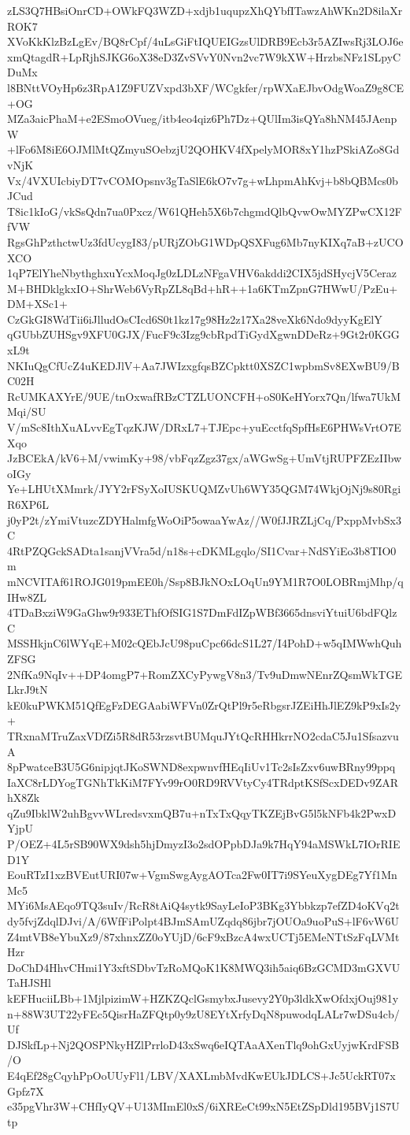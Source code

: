 zLS3Q7HBsiOnrCD+OWkFQ3WZD+xdjb1uqupzXhQYbfITawzAhWKn2D8ilaXrROK7
XVoKkKlzBzLgEv/BQ8rCpf/4uLsGiFtIQUEIGzsUlDRB9Ecb3r5AZIwsRj3LOJ6e
xmQtagdR+LpRjhSJKG6oX38eD3ZvSVvY0Nvn2vc7W9kXW+HrzbsNFz1SLpyCDuMx
l8BNttVOyHp6z3RpA1Z9FUZVxpd3bXF/WCgkfer/rpWXaEJbvOdgWoaZ9g8CE+OG
MZa3aicPhaM+e2ESmoOVueg/itb4eo4qiz6Ph7Dz+QUlIm3isQYa8hNM45JAenpW
+lFo6M8iE6OJMlMtQZmyuSOebzjU2QOHKV4fXpelyMOR8xY1hzPSkiAZo8GdvNjK
Vx/4VXUIcbiyDT7vCOMOpsnv3gTaSlE6kO7v7g+wLhpmAhKvj+b8bQBMcs0bJCud
T8ic1kIoG/vkSsQdn7ua0Pxcz/W61QHeh5X6b7chgmdQlbQvwOwMYZPwCX12FfVW
RgsGhPzthctwUz3fdUcygI83/pURjZObG1WDpQSXFug6Mb7nyKIXq7aB+zUCOXCO
1qP7ElYheNbythghxuYcxMoqJg0zLDLzNFgaVHV6akddi2CIX5jdSHycjV5Ceraz
M+BHDklgkxIO+ShrWeb6VyRpZL8qBd+hR++1a6KTmZpnG7HWwU/PzEu+DM+XSc1+
CzGkGI8WdTii6iJlludOsCIcd6S0t1kz17g98Hz2z17Xa28veXk6Ndo9dyyKgElY
qGUbbZUHSgv9XFU0GJX/FucF9c3Izg9cbRpdTiGydXgwnDDeRz+9Gt2r0KGGxL9t
NKIuQgCfUcZ4uKEDJlV+Aa7JWIzxgfqsBZCpktt0XSZC1wpbmSv8EXwBU9/BC02H
RcUMKAXYrE/9UE/tnOxwafRBzCTZLUONCFH+oS0KeHYorx7Qn/lfwa7UkMMqi/SU
V/mSc8IthXuALvvEgTqzKJW/DRxL7+TJEpc+yuEcctfqSpfHsE6PHWsVrtO7EXqo
JzBCEkA/kV6+M/vwimKy+98/vbFqzZgz37gx/aWGwSg+UmVtjRUPFZEzIIbwoIGy
Ye+LHUtXMmrk/JYY2rFSyXoIUSKUQMZvUh6WY35QGM74WkjOjNj9s80RgiR6XP6L
j0yP2t/zYmiVtuzcZDYHalmfgWoOiP5owaaYwAz//W0fJJRZLjCq/PxppMvbSx3C
4RtPZQGckSADta1sanjVVra5d/n18s+cDKMLgqlo/SI1Cvar+NdSYiEo3b8TIO0m
mNCVITAf61ROJG019pmEE0h/Ssp8BJkNOxLOqUn9YM1R7O0LOBRmjMhp/qIHw8ZL
4TDaBxziW9GaGhw9r933EThfOfSIG1S7DmFdIZpWBf3665dnsviYtuiU6bdFQlzC
MSSHkjnC6lWYqE+M02cQEbJcU98puCpc66dcS1L27/I4PohD+w5qIMWwhQuhZFSG
2NfKa9NqIv++DP4omgP7+RomZXCyPywgV8n3/Tv9uDmwNEnrZQsmWkTGELkrJ9tN
kE0kuPWKM51QfEgFzDEGAabiWFVn0ZrQtPl9r5eRbgsrJZEiHhJlEZ9kP9xIs2y+
TRxnaMTruZaxVDfZi5R8dR53rzsvtBUMquJYtQcRHHkrrNO2cdaC5Ju1SfsazvuA
8pPwatceB3U5G6nipjqtJKoSWND8expwnvfHEqIiUv1Tc2sIsZxv6uwBRny99ppq
IaXC8rLDYogTGNhTkKiM7FYv99rO0RD9RVVtyCy4TRdptKSfScxDEDv9ZARhX8Zk
qZu9IbklW2uhBgvvWLredsvxmQB7u+nTxTxQqyTKZEjBvG5l5kNFb4k2PwxDYjpU
P/OEZ+4L5rSB90WX9dsh5hjDmyzI3o2sdOPpbDJa9k7HqY94aMSWkL7IOrRIED1Y
EouRTzI1xzBVEutURI07w+VgmSwgAygAOTca2Fw0IT7i9SYeuXygDEg7Yf1MnMc5
MYi6MsAEqo9TQ3suIv/RcR8tAiQ4sytk9SayLeIoP3BKg3Ybbkzp7efZD4oKVq2t
dy5fvjZdqlDJvi/A/6WfFiPolpt4BJmSAmUZqdq86jbr7jOUOa9uoPuS+lF6vW6U
Z4mtVB8eYbuXz9/87xhnxZZ0oYUjD/6cF9xBzcA4wxUCTj5EMeNTtSzFqLVMtHzr
DoChD4HhvCHmi1Y3xftSDbvTzRoMQoK1K8MWQ3ih5aiq6BzGCMD3mGXVUTaHJSHl
kEFHuciiLBb+1MjlpizimW+HZKZQclGsmybxJusevy2Y0p3ldkXwOfdxjOuj981y
n+88W3UT22yFEc5QisrHaZFQtp0y9zU8EYtXrfyDqN8puwodqLALr7wDSu4cb/Uf
DJSkfLp+Nj2QOSPNkyHZlPrrloD43xSwq6eIQTAaAXenTlq9ohGxUyjwKrdFSB/O
E4qEf28gCqyhPpOoUUyFl1/LBV/XAXLmbMvdKwEUkJDLCS+Jc5UckRT07xGpfz7X
e35pgVhr3W+CHfIyQV+U13MImEl0xS/6iXREeCt99xN5EtZSpDld195BVj1S7Utp
